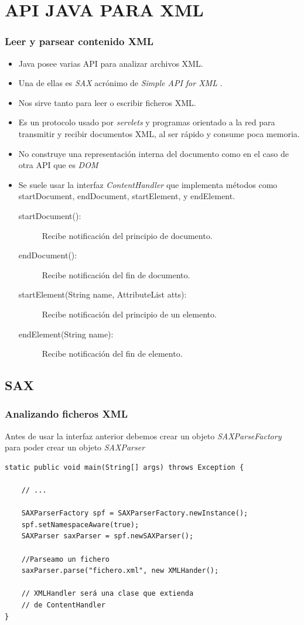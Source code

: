 \documentclass{beamer}
\begin{document}
\section{API JAVA PARA XML}
\begin{frame}
\frametitle{Leer y parsear contenido XML} 

\begin{itemize}[<+-| alert@+>]
      \item Java posee varias API para analizar archivos XML.
      \item Una de ellas es \emph{SAX} acrónimo de \emph{Simple API for XML }.
      \item Nos sirve tanto para leer o escribir ficheros XML.
     \item Es un protocolo usado por \emph{servlets} y programas orientado a la red para transmitir y recibir documentos XML, al ser rápido y consume poca memoria.
      \item No construye una representación interna del documento como en el caso de otra API que es \emph{DOM}
      \item Se suele usar la interfaz \emph{ContentHandler} que implementa métodos como \alert{startDocument, endDocument, startElement, y endElement.}
      \begin{description}
      \item[startDocument():] Recibe notificación del principio de documento.
      \item[endDocument():] Recibe notificación del fin de documento.
      \item[startElement(String name, AttributeList atts):] Recibe notificación del principio de un elemento.
      \item[endElement(String name):] Recibe notificación del fin de elemento.
      \end{description}
      \end{itemize}
\end{frame}

\subsection{SAX}
\begin{frame}[fragile]
\frametitle{Analizando ficheros XML}
Antes de usar la interfaz anterior debemos crear un objeto \emph{SAXParseFactory} para poder crear un objeto \emph{SAXParser}
\begin{verbatim}
static public void main(String[] args) throws Exception {

    // ...

    SAXParserFactory spf = SAXParserFactory.newInstance();
    spf.setNamespaceAware(true);
    SAXParser saxParser = spf.newSAXParser();
    
    //Parseamo un fichero
    saxParser.parse("fichero.xml", new XMLHander();
    
    // XMLHandler será una clase que extienda 
    // de ContentHandler
}
\end{verbatim}
\end{frame}
\end{document}
